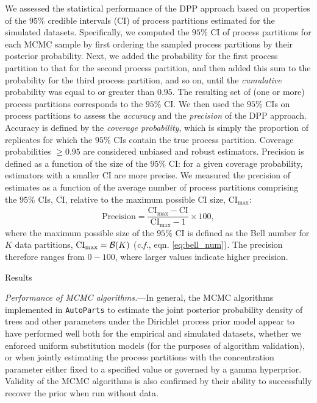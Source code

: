 \documentclass[11pt]{article}
\begin{document}
We assessed the statistical performance of the DPP approach based on properties of the $95\%$ credible intervals (CI) of process partitions estimated for the simulated datasets.  
Specifically, we computed the $95\%$ CI of process partitions for each MCMC sample by first ordering the sampled process partitions by their posterior probability.
Next, we added the probability for the first process partition to that for the second process partition, and then added this sum to the probability for the third process partition, and so on, until the \emph{cumulative} probability was equal to or greater than $0.95$.
The resulting set of (one or more) process partitions corresponds to the $95\%$ CI. 
We then used the $95\%$ CIs on process partitions to assess the \emph{accuracy} and the \emph{precision} of the DPP approach. 
Accuracy is defined by the \emph{coverage probability}, which is simply the proportion of replicates for which the $95\%$ CIs contain the true process partition.
Coverage probabilities $\geq 0.95$ are considered unbiased and robust estimators.
Precision is defined as a function of the size of the $95\%$ CI: for a given coverage probability, estimators with a smaller CI are more precise.
We measured the precision of estimates as a function of the average number of process partitions comprising the $95\%$ CIs, $\overline{\text{CI}}$, relative to the maximum possible CI size, $\text{CI}_{\text{max}}$: 
$$
\text{Precision} = \frac{\text{CI}_{\text{max}}-\overline{\text{CI}}}{{\text{CI}_{\text{max}}}-1} \times 100,
$$
\noindent
where the maximum possible size of the $95\%$ CI is defined as the Bell number for $K$ data partitions, $\text{CI}_{\text{max}} = {\cal B}(K)$ (\emph{c.f.}, eqn. \ref{eq:bell_num}).
The precision therefore ranges from $0-100$, where larger values indicate higher precision.


\bigskip

\begin{center}
{\sc Results}
\end{center}

\noindent
{\it Performance of MCMC algorithms.}---In general, the MCMC algorithms implemented in \verb!AutoParts! to estimate the joint posterior probability density of trees and other parameters under the Dirichlet process prior model appear to have performed well both for the empirical and simulated datasets, whether we enforced uniform substitution models (for the 
purposes of algorithm validation), or when jointly estimating the process partitions with the concentration parameter either fixed to a specified value or governed by a gamma hyperprior.
Validity of the MCMC algorithms is also confirmed by their ability to successfully recover the prior when run without data.
\end{document}
